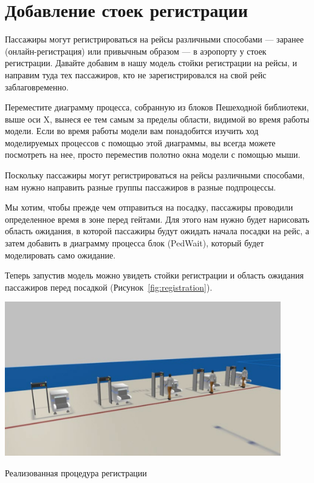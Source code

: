 \section{Добавление стоек регистрации}
Пассажиры могут регистрироваться на рейсы различными способами --- заранее
(онлайн-регистрация) или привычным образом --- в аэропорту у стоек
регистрации. Давайте добавим в нашу модель стойки регистрации на рейсы, и
направим туда тех пассажиров, кто не зарегистрировался на свой рейс
заблаговременно.\par
Переместите диаграмму процесса, собранную из блоков Пешеходной
библиотеки, выше оси X, вынеся ее тем самым за пределы области, видимой во
время работы модели. Если во время работы модели вам понадобится изучить
ход моделируемых процессов с помощью этой диаграммы, вы всегда можете
посмотреть на нее, просто переместив полотно окна модели с помощью мыши.\par
Поскольку пассажиры могут регистрироваться на рейсы различными способами,
нам нужно направить разные группы пассажиров в разные подпроцессы.\par
Мы хотим, чтобы прежде чем отправиться на посадку, пассажиры проводили
определенное время в зоне перед гейтами. Для этого нам нужно будет
нарисовать область ожидания, в которой пассажиры будут ожидать начала
посадки на рейс, а затем добавить в диаграмму процесса блок (PedWait),
который будет моделировать само ожидание.\par
Теперь запустив модель можно увидеть стойки регистрации и область ожидания
пассажиров перед посадкой (Рисунок~\ref{fig:registration}).

\begin{image}
	\includegraphics[width=0.9\textwidth]{Screenshot from 2023-04-11 14-57-23}
	\caption{Реализованная процедура регистрации}
	\label{fig:registration}
\end{image}

